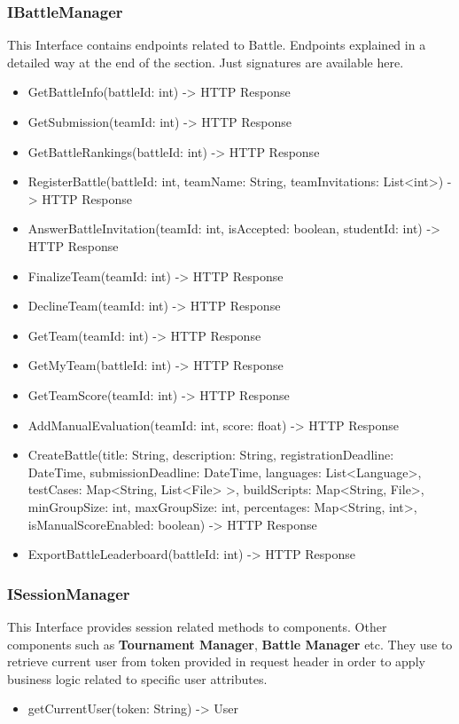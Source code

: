 \subsubsection{IBattleManager}
This Interface contains endpoints related to Battle. Endpoints explained in a detailed way at the end of the section. Just signatures are available here.
\begin{itemize}
\item GetBattleInfo(battleId: int) -> HTTP Response
\item GetSubmission(teamId: int) -> HTTP Response
\item GetBattleRankings(battleId: int) -> HTTP Response
\item RegisterBattle(battleId: int, teamName: String, teamInvitations: List<int>) -> HTTP Response 
\item AnswerBattleInvitation(teamId: int, isAccepted: boolean, studentId: int) -> HTTP Response
\item FinalizeTeam(teamId: int) -> HTTP Response
\item DeclineTeam(teamId: int) -> HTTP Response
\item GetTeam(teamId: int) -> HTTP Response
\item GetMyTeam(battleId: int) -> HTTP Response
\item GetTeamScore(teamId: int) -> HTTP Response
\item AddManualEvaluation(teamId: int, score: float) -> HTTP Response
\item CreateBattle(title: String, description: String, registrationDeadline: DateTime, submissionDeadline: DateTime, languages: List<Language>, testCases: Map<String, List<File> >, buildScripts: Map<String, File>, minGroupSize: int, maxGroupSize: int, percentages: Map<String, int>, isManualScoreEnabled: boolean) -> HTTP Response 
\item ExportBattleLeaderboard(battleId: int) -> HTTP Response
\end{itemize}

\subsubsection{ISessionManager}
This Interface provides session related methods to components. Other components such as \textbf{Tournament Manager}, \textbf{Battle Manager} etc. They use to retrieve current user from token provided in request header in order to apply business logic related to specific user attributes.
\begin{itemize}
    \item getCurrentUser(token: String) -> User
\end{itemize}
